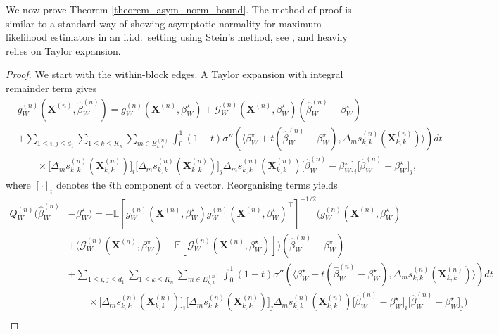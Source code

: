 \documentclass{article}
\begin{document}
We now prove Theorem \ref{theorem_asym_norm_bound}. The method of proof is similar to a standard way of showing asymptotic normality for maximum likelihood estimators in an i.i.d.\ setting using Stein's method, see \cite{anastasiou2020bounds}, and heavily relies on Taylor expansion.
\begin{proof}
We start with the within-block edges. A Taylor expansion with integral remainder term gives
\begin{align*}
    & g_W^{(n)}(\mathbf{X}^{(n)},\hat{\beta}_W^{(n)}) = g_W^{(n)}(\mathbf{X}^{(n)},\beta_W^{\star}) + \mathcal{G}_W^{(n)}(\mathbf{X}^{(n)},\beta_W^{\star}) (\hat{\beta}_W^{(n)} - \beta_W^{\star}) \\
    &+ \sum_{1 \leq i,j \leq d_1} \sum_{1\leq k \leq K_n} \sum_{m \in E_{k,k}^{(n)}} \int_0^1 (1-t) \sigma'' ( \langle \beta_W^{\star} + t(\hat{\beta}_W^{(n)} - \beta_W^{\star}) , \Delta_m s_{k,k}^{(n)}(\mathbf{X}_{k,k}^{(n)}) \rangle )dt  \\
    & \qquad \times \big[\Delta_m s_{k,k}^{(n)}(\mathbf{X}_{k,k}^{(n)}) \big]_i \big[\Delta_m s_{k,k}^{(n)}(\mathbf{X}_{k,k}^{(n)}) \big]_j \Delta_m s_{k,k}^{(n)}(\mathbf{X}_{k,k}^{(n)})  \big[ \hat{\beta}_W^{(n)}-\beta_W^{\star}\big]_i \big[ \hat{\beta}_W^{(n)}-\beta_W^{\star}\big]_j,
\end{align*}
where $[\cdot]_i$ denotes the $i$th component of a vector. Reorganising terms yields
\begin{align*}
    Q_W^{(n)} \big( \hat{\beta}_W^{(n)}&-\beta_W^{\star}\big) = -\mathbb{E}[g_W^{(n)}(\mathbf{X}^{(n)},\beta_W^{\star})g_W^{(n)}(\mathbf{X}^{(n)},\beta_W^{\star})^{\top}]^{-1/2} \bigg( g_W^{(n)}(\mathbf{X}^{(n)},\beta_W^{\star}) \\
    &+ \big(\mathcal{G}_W^{(n)}(\mathbf{X}^{(n)},\beta_W^{\star}) - \mathbb{E}[\mathcal{G}_W^{(n)}(\mathbf{X}^{(n)},\beta_W^{\star})]  \big)(\hat{\beta}_W^{(n)} - \beta_W^{\star})  \\
    & +\sum_{1 \leq i,j \leq d_1} \sum_{1\leq k \leq K_n} \sum_{m \in E_{k,k}^{(n)}} \int_0^1 (1-t) \sigma'' ( \langle \beta_W^{\star} + t(\hat{\beta}_W^{(n)} - \beta_W^{\star}) , \Delta_m s_{k,k}^{(n)}(\mathbf{X}_{k,k}^{(n)}) \rangle )dt  \\
    & \qquad \times \big[\Delta_m s_{k,k}^{(n)}(\mathbf{X}_{k,k}^{(n)}) \big]_i \big[\Delta_m s_{k,k}^{(n)}(\mathbf{X}_{k,k}^{(n)}) \big]_j \Delta_m s_{k,k}^{(n)}(\mathbf{X}_{k,k}^{(n)})  \big[ \hat{\beta}_W^{(n)}-\beta_W^{\star}\big]_i \big[ \hat{\beta}_W^{(n)}-\beta_W^{\star}\big]_j \bigg)  \\

\end{align*}
\end{proof}
\end{document}

